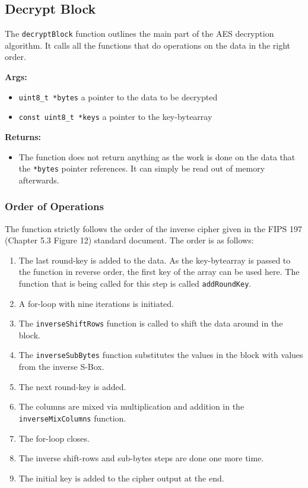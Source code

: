 \subsection{Decrypt Block}
\label{ch:dec_block}
The \lstinline{decryptBlock} function outlines the main part of the AES decryption algorithm. It calls all the functions that do operations on the data in the right order.

\textbf{Args:}
\begin{itemize}
  \item \lstinline{uint8_t *bytes} a pointer to the data to be decrypted
  \item \lstinline{const uint8_t *keys} a pointer to the key-bytearray
\end{itemize}

\textbf{Returns:}
\begin{itemize}
  \item The function does not return anything as the work is done on the data that the \lstinline{*bytes} pointer references. It can simply be read out of memory afterwards.
\end{itemize}

\subsubsection{Order of Operations}
The function strictly follows the order of the inverse cipher given in the FIPS 197 (Chapter 5.3 Figure 12) standard document. The order is as follows:
\begin{enumerate}
  \item The last round-key is added to the data. As the key-bytearray is passed to the function in reverse order, the first key of the array can be used here. The function that is being called for this step is called \lstinline{addRoundKey}.
  \item A for-loop with nine iterations is initiated.
  \item The \lstinline{inverseShiftRows} function is called to shift the data around in the block.
  \item The \lstinline{inverseSubBytes} function substitutes the values in the block with values from the inverse S-Box.
  \item The next round-key is added.
  \item The columns are mixed via multiplication and addition in the \lstinline{inverseMixColumns} function.
  \item The for-loop closes.
  \item The inverse shift-rows and sub-bytes steps are done one more time.
  \item The initial key is added to the cipher output at the end.
\end{enumerate}


